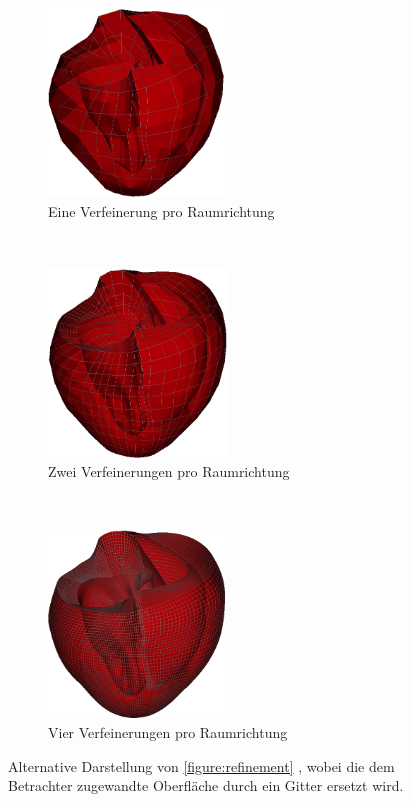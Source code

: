 \documentclass[
	a4paper,			%
	11pt,				%
	headsepline,		%
	bibtotoc,			%
	BCOR18mm,      		%
	DIV14,				%
	headings=normal,
	numbers=noenddot,
]{scrbook}
\theoremstyle{mythmstyle}
\theoremstyle{other}
\begin{document}
	\clearpage
		\begin{figure}[t]
	
	\begin{subfigure}[t]{0.3\textwidth}
		\centering
		\includegraphics[height=5cm]{heart111_mesh.png}%
		\caption{Eine Verfeinerung pro Raumrichtung}
	\end{subfigure}
	~
	\begin{subfigure}[t]{0.3\textwidth}
		\centering
		\includegraphics[height=5cm]{heart222_mesh.png}%
		\caption{Zwei Verfeinerungen pro Raumrichtung}
	\end{subfigure}
	~
		\begin{subfigure}[t]{0.3\textwidth}
		\centering
		\includegraphics[height=5cm]{heart444_mesh.png}
		\caption{Vier Verfeinerungen pro Raumrichtung}
	\end{subfigure}
	
	\caption{Alternative Darstellung von \autoref{figure:refinement} , wobei die dem Betrachter zugewandte 
	Oberfläche durch ein Gitter ersetzt wird.}
		
	\label{figure:refinement_mesh}
	\end{figure}
\end{document}
